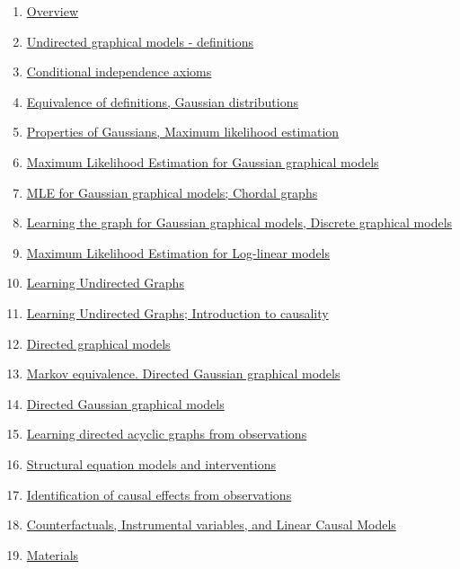 \documentclass[11pt]{article}
\begin{document}
\begin{enumerate}
	\item \href{https://mp.weixin.qq.com/s/5iQ3uhnDR9QftKlPvxRZXA}{Overview}	%
	\item \href{https://mp.weixin.qq.com/s/qgy3DL0UQhDu8pzOWQ6Flg}{Undirected  graphical models - definitions}	%
	\item \href{https://mp.weixin.qq.com/s/ItVy0-fagZ4JRCftNziHbA}{Conditional independence axioms}	%
	\item \href{https://mp.weixin.qq.com/s/leZTPUh9iLrExCov0nIO7Q}{Equivalence of definitions, Gaussian distributions}	%
	\item \href{https://mp.weixin.qq.com/s/jdwikjZug7JxeTsQdCZd_QL}{Properties of Gaussians, Maximum likelihood estimation}	%
	\item \href{https://mp.weixin.qq.com/s/ftYULq-m_-c97a9lI1LsVQ}{Maximum Likelihood Estimation for Gaussian graphical models}	%
	\item \href{https://mp.weixin.qq.com/s/PEvf_utRW4bQ74-Fx4PNqw}{MLE for Gaussian graphical models; Chordal graphs}	%
	\item \href{https://mp.weixin.qq.com/s/ZjsU_or-nT61znCeaKYEKg}{Learning the graph for Gaussian graphical models, Discrete graphical models}	%
	\item \href{https://mp.weixin.qq.com/s/S1MeH0zFxD8yNz9bvtk1sw}{Maximum Likelihood Estimation for Log-linear models}	%
	\item \href{https://mp.weixin.qq.com/s/2iqheQlQRTL1_nWRQ5h0sA}{Learning Undirected Graphs}	%
	\item \href{https://mp.weixin.qq.com/s/4FoiOqfZ1cSuL9-Yd0sGig}{Learning Undirected Graphs; Introduction to causality}	%
	\item \href{https://mp.weixin.qq.com/s/4BLgHEC5JiUVpRfHtMm8LA}{Directed graphical models}	%
	\item \href{https://mp.weixin.qq.com/s/ki4Ekny3bQ-guBFAe8GPrg}{Markov equivalence. Directed Gaussian graphical models}	%
	\item \href{https://mp.weixin.qq.com/s/Kl9G9VgNFoTA-yDUyN9oTw}{Directed Gaussian graphical models}	%
	\item \href{https://mp.weixin.qq.com/s/UzWR9RTlIGxMUM-hjIj3iw}{Learning directed acyclic graphs from observations}	%
	\item \href{https://mp.weixin.qq.com/s/yz4KqX1c1dmxZ6SYxGHDGg}{Structural equation models and interventions}	%
	\item \href{https://mp.weixin.qq.com/s/2sGNtFsgCa4Gjd6a_gYqrQ}{Identification of causal effects from observations}	%
	\item \href{https://mp.weixin.qq.com/s/XwNMIs1kBna8qDFazSgYxA}{Counterfactuals, Instrumental variables, and Linear Causal Models}	%
	\item \href{https://pan.baidu.com/s/1lDEk2ln4MqXK_HIwkgSMoQ}{Materials}
\end{enumerate}
\end{document}
